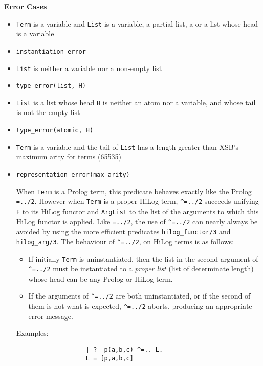 \begin{description}
{\bf Error Cases}
\begin{itemize}
\item {\tt Term} is a variable and {\tt List} is a variable, a partial list,
a  or a list whose head is a variable
\bi
\item {\tt instantiation\_error}
\ei
\item {\tt List} is neither a variable nor a non-empty list
\bi
\item {\tt type\_error(list, H)}
\ei
\item {\tt List} is a list whose head {\tt H} is neither an atom nor a
  variable, and whose tail is not the empty list 
\bi
\item {\tt type\_error(atomic, H)}
\ei
\item {\tt Term} is a variable and the tail of {\tt List} has a length
  greater than XSB's maximum arity for terms (65535) 
\bi
\item {\tt representation\_error(max\_arity)}
\ei
\ei


    When {\tt Term} is a Prolog term, this predicate behaves exactly like
    the Prolog {\tt =../2}. However when {\tt Term} is a proper HiLog term, 
    {\tt \verb|^|=../2} 
    succeeds unifying {\tt F} to its HiLog functor and {\tt ArgList} to the 
    list of the arguments to which this HiLog functor is applied. Like 
    {\tt =../2}, the use of {\tt \verb|^|=../2} can nearly always be avoided
    by using the more efficient predicates {\tt hilog\_functor/3} and 
    {\tt hilog\_arg/3}. The behaviour of {\tt \verb|^|=../2}, on HiLog terms 
    is as follows:
    \begin{itemize}
    \item If initially {\tt Term} is uninstantiated, then the list in the 
          second argument of {\tt \verb|^|=../2} must be instantiated to 
          a {\em proper list} (list of determinate length) whose head can 
          be any Prolog or HiLog term.
    \item If the arguments of {\tt \verb|^|=../2} are both uninstantiated, 
          or if the second of them is not what is expected, 
          {\tt \verb|^|=../2} aborts, producing an appropriate error message.
    \end{itemize}
    Examples:
    {\footnotesize
     \begin{verbatim}
                   | ?- p(a,b,c) ^=.. L.
                   L = [p,a,b,c]


\end{verbatim}}
\end{itemize}
\end{description}

